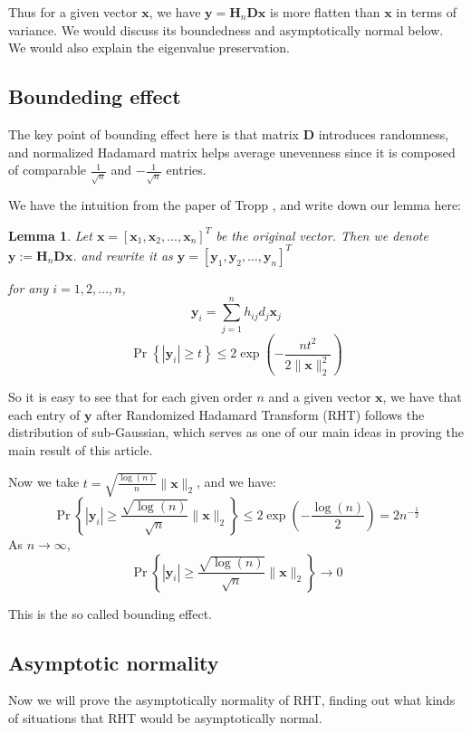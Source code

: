 \documentclass[11pt]{article}
\numberwithin{equation}{section}
\theoremstyle{plain}
\newtheorem{lemma}[theorem]{Lemma}
\theoremstyle{definition}
\theoremstyle{remark}
\begin{document}
Thus for a given vector $\mathbf{x}$, we have $\mathbf{y} = \mathbf{H}_{n}\mathbf{D}\mathbf{x}$ is more flatten than $\mathbf{x}$ in terms of variance. We would discuss its boundedness and asymptotically normal below. We would also explain the eigenvalue preservation.
\subsection{Boundeding effect}

The key point of bounding effect here is that matrix $\mathbf{D}$ introduces randomness, and normalized Hadamard matrix helps average unevenness since it is composed of comparable $\frac{1}{\sqrt{n}}$ and $-\frac{1}{\sqrt{n}}$ entries.

We have the intuition from the paper of Tropp \cite{tropp2011improvedanalysissubsampledrandomized}, and write down our lemma here:

\begin{lemma}
  \label{lem:boundedness}
Let $\mathbf{x} = [\mathbf{x}_1, \mathbf{x}_2, \ldots, \mathbf{x}_n]^T$ be the original vector. 
Then we denote $\mathbf{y}:=\mathbf{H}_n\mathbf{D}\mathbf{x}$.
and rewrite it as $\mathbf{y} = [\mathbf{y}_1, \mathbf{y}_2, \ldots, \mathbf{y}_n]^T$

for any $i = 1, 2, \ldots, n$,
\[
\mathbf{y}_i = \sum_{j=1}^n h_{ij}d_j\mathbf{x}_j \tag{6.1}\label{eq:6.1}
\]
\[
\Pr{\left\{\left|\mathbf{y}_i\right|\geq t\right\}}\leq 2\exp\left(-\frac{nt^2}{2\|\mathbf{x}\|_2^2}\right) \tag{6.2}\label{eq:6.2}
\]
\end{lemma}

So it is easy to see that for each given order $n$ and a given vector $\mathbf{x}$, we have that each entry of $\mathbf{y}$ after Randomized Hadamard Transform (RHT) follows the distribution of sub-Gaussian, which serves as one of our main ideas in proving the main result of this article.

Now we take $t = \sqrt{\frac{\log(n)}{n}}\|\mathbf{x}\|_2$, and we have:
\[
\Pr{\left\{\left|\mathbf{y}_{i}\right|\geq \frac{\sqrt{\log(n)}}{\sqrt{n}}\|\mathbf{x}\|_2\right\}}\leq 2\exp\left(-\frac{\log(n)}{2}\right) = 2n^{-\frac{1}{2}} \tag{6.3}\label{eq:6.3}
\]
As $n \to \infty$,
\[
\Pr{\left\{\left|\mathbf{y}_{i}\right|\geq \frac{\sqrt{\log(n)}}{\sqrt{n}}\|\mathbf{x}\|_2\right\}} \to 0 \tag{6.4}\label{eq:6.4}
\]


This is the so called bounding effect.
\subsection{Asymptotic normality}
Now we will prove the asymptotically normality of RHT, finding out what kinds of situations that RHT would be asymptotically normal.
\end{document}
